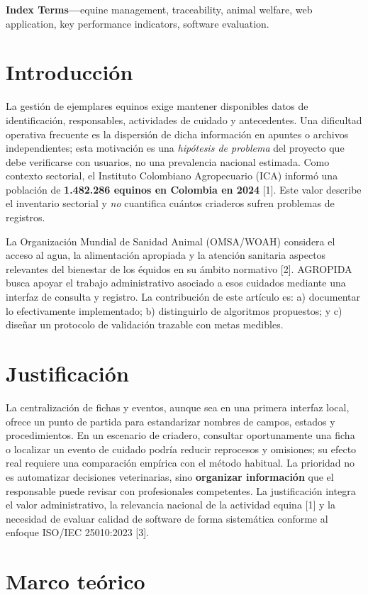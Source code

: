 \documentclass[conference,10pt]{IEEEtran}
\begin{document}
\noindent\textbf{Index Terms---}equine management, traceability, animal welfare, web application, key performance indicators, software evaluation.

\section{Introducción}
La gestión de ejemplares equinos exige mantener disponibles datos de identificación, responsables, actividades de cuidado y antecedentes. Una dificultad operativa frecuente es la dispersión de dicha información en apuntes o archivos independientes; esta motivación es una \emph{hipótesis de problema} del proyecto que debe verificarse con usuarios, no una prevalencia nacional estimada. Como contexto sectorial, el Instituto Colombiano Agropecuario (ICA) informó una población de \textbf{1.482.286 equinos en Colombia en 2024} [1]. Este valor describe el inventario sectorial y \emph{no} cuantifica cuántos criaderos sufren problemas de registros.

La Organización Mundial de Sanidad Animal (OMSA/WOAH) considera el acceso al agua, la alimentación apropiada y la atención sanitaria aspectos relevantes del bienestar de los équidos en su ámbito normativo [2]. AGROPIDA busca apoyar el trabajo administrativo asociado a esos cuidados mediante una interfaz de consulta y registro. La contribución de este artículo es: a) documentar lo efectivamente implementado; b) distinguirlo de algoritmos propuestos; y c) diseñar un protocolo de validación trazable con metas medibles.

\section{Justificación}
La centralización de fichas y eventos, aunque sea en una primera interfaz local, ofrece un punto de partida para estandarizar nombres de campos, estados y procedimientos. En un escenario de criadero, consultar oportunamente una ficha o localizar un evento de cuidado podría reducir reprocesos y omisiones; su efecto real requiere una comparación empírica con el método habitual. La prioridad no es automatizar decisiones veterinarias, sino \textbf{organizar información} que el responsable puede revisar con profesionales competentes. La justificación integra el valor administrativo, la relevancia nacional de la actividad equina [1] y la necesidad de evaluar calidad de software de forma sistemática conforme al enfoque ISO/IEC 25010:2023 [3].

\section{Marco teórico}
\end{document}
